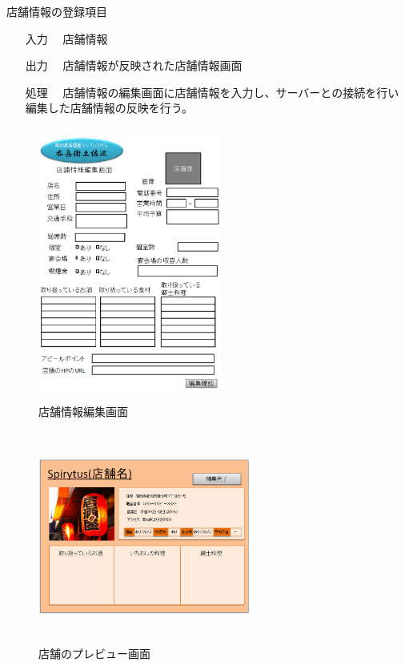 \documentclass[a4j,titlepage]{jarticle}
\begin{document}
店舗情報の登録項目
\begin{enumerate}
  \item [入力]　店舗情報
  \item [出力]　店舗情報が反映された店舗情報画面
  \item [処理]　店舗情報の編集画面に店舗情報を入力し、サーバーとの接続を行い編集した店舗情報の反映を行う。
\end{enumerate}

\begin{figure}[htbp]
  \begin{center}
  \includegraphics [height=9cm, width=6cm]{extrnal1_design_document_image/s6.eps}
  \caption{店舗情報編集画面}
  \label {fig:s6}
  \end{center}
\end{figure}

\begin{figure}[htbp]
  \begin{center}
  \includegraphics [height=7cm, width=7cm]{extrnal1_design_document_image/s7.eps}
  \caption{店舗のプレビュー画面}
  \label {fig:s7}
  \end{center}
\end{figure}
\end{document}
